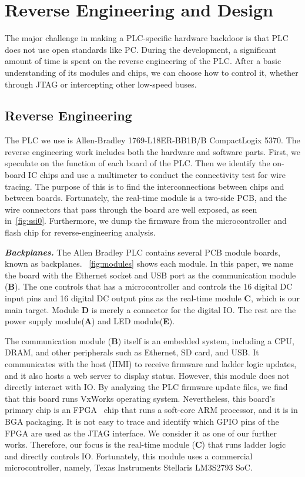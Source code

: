 \section{Reverse Engineering and Design}
\label{sec:implant-design}


The major challenge in making a PLC-specific hardware backdoor is that PLC does not use open standards like PC.  During the development, a significant amount of time is spent on the reverse engineering of the PLC. After a basic understanding of its modules and chips, we can choose how to control it, whether through JTAG or intercepting other low-speed buses.


\subsection{Reverse Engineering}
The PLC we use is Allen-Bradley 1769-L18ER-BB1B/B CompactLogix 5370.
The reverse engineering work includes both the hardware and software parts. First, we speculate on the function of each board of the PLC. Then we identify the on-board IC chips and use a multimeter to conduct the connectivity test for wire tracing. The purpose of this is to find the interconnections between chips and between boards. Fortunately, the real-time module is a two-side PCB, and the wire connectors that pass through the board are well exposed, as seen in~\autoref{fig:ssi0}. Furthermore, we dump the firmware from the microcontroller and flash chip for reverse-engineering analysis.


\textbf{\textit{Backplanes.}} The Allen Bradley PLC contains several PCB module boards, known as backplanes. ~\autoref{fig:modules} shows each module. In this paper, we name the board with the Ethernet socket and USB port as the communication module (\textbf{B}).  The one controls that has a microcontroller and controls the 16 digital DC input pins and 16 digital DC output pins as the real-time module {\textbf{C}}, which is our main target. Module \textbf{D} is merely a connector for the digital IO. The rest are the power supply module(\textbf{A}) and LED module(\textbf{E}).


The communication module (\textbf{B}) itself is an embedded system, including a CPU, DRAM, and other peripherals such as Ethernet, SD card, and USB.  It communicates with the host (HMI) to receive firmware and ladder logic updates, and it also hosts a web server to display status. However, this module does not directly interact with IO. By analyzing the PLC firmware update files, we find that this board runs VxWorks operating system. Nevertheless, this board's primary chip is an FPGA~\cite{kuon2008fpga} chip that runs a soft-core ARM processor, and it is in BGA packaging. It is not easy to trace and identify which GPIO pins of the FPGA are used as the JTAG interface. We consider it as one of our further works. Therefore, our focus is the real-time module (\textbf{C}) that runs ladder logic and directly controls IO. Fortunately, this module uses a commercial microcontroller, namely, Texas Instruments Stellaris LM3S2793 SoC.

